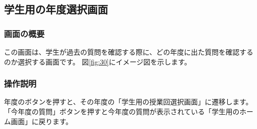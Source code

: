 \newpage

\subsection{学生用の年度選択画面}
\subsubsection{画面の概要}
この画面は、学生が過去の質問を確認する際に、どの年度に出た質問を確認するのか選択する画面です。
図\ref{fig:30}にイメージ図を示します。

\subsubsection{操作説明}
年度のボタンを押すと、その年度の「学生用の授業回選択画面」に遷移します。
「今年度の質問」ボタンを押すと今年度の質問が表示されている「学生用のホーム画面」に戻ります。




